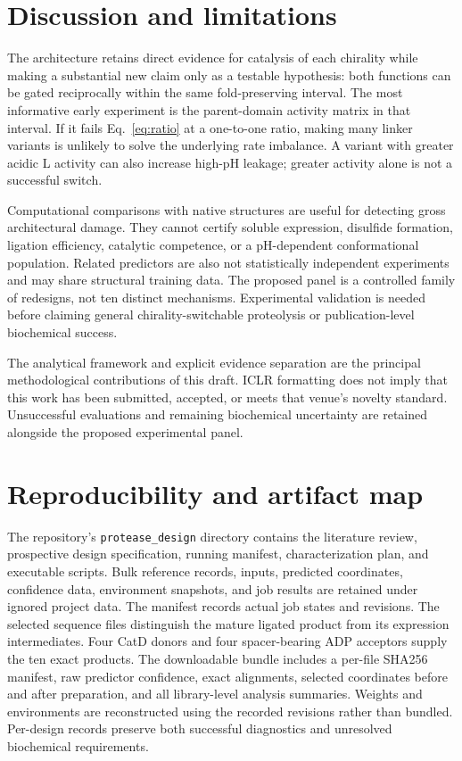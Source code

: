 \documentclass{article}
\begin{document}
\section{Discussion and limitations}
The architecture retains direct evidence for catalysis of each chirality while
making a substantial new claim only as a testable hypothesis: both functions
can be gated reciprocally within the same fold-preserving interval. The most
informative early experiment is the parent-domain activity matrix in that
interval. If it fails Eq.~\ref{eq:ratio} at a one-to-one ratio, making many
linker variants is unlikely to solve the underlying rate imbalance. A variant
with greater acidic L activity can also increase high-pH leakage; greater
activity alone is not a successful switch.

Computational comparisons with native structures are useful for detecting
gross architectural damage. They cannot certify soluble expression,
disulfide formation, ligation efficiency, catalytic competence, or a
pH-dependent conformational population. Related predictors are also not
statistically independent experiments and may share structural training data.
The proposed panel is a controlled family of redesigns, not ten distinct
mechanisms. Experimental validation is needed before claiming general
chirality-switchable proteolysis or publication-level biochemical success.

The analytical framework and explicit evidence separation are the principal
methodological contributions of this draft. ICLR formatting does not imply
that this work has been submitted, accepted, or meets that venue's novelty
standard. Unsuccessful evaluations and remaining biochemical uncertainty are retained
alongside the proposed experimental panel.




\appendix
\section{Reproducibility and artifact map}
The repository's \texttt{protease\_design} directory contains the literature
review, prospective design specification, running manifest, characterization
plan, and executable scripts. Bulk reference records, inputs, predicted
coordinates, confidence data, environment snapshots, and job results are
retained under ignored project data. The manifest records actual job states
and revisions. The selected sequence files distinguish the mature ligated product from
its expression intermediates. Four CatD donors and four spacer-bearing ADP
acceptors supply the ten exact products. The downloadable bundle includes
a per-file SHA256 manifest, raw predictor confidence, exact alignments,
selected coordinates before and after preparation, and all library-level
analysis summaries. Weights and environments are reconstructed using the
recorded revisions rather than bundled. Per-design records preserve both successful
diagnostics and unresolved biochemical requirements.
\end{document}
